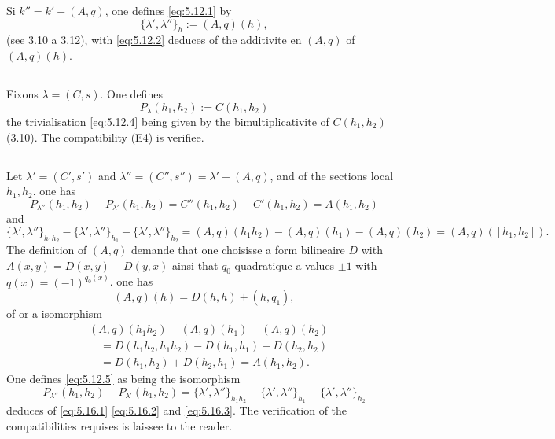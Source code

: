 \documentclass[12pt,a4paper]{article}
\theoremstyle{plain}
\theoremstyle{definition}
\theoremstyle{remark}
\begin{document}
Si $k'' = k' + (A, q)$, one defines \eqref{eq:5.12.1} by
\[
\{\lambda', \lambda''\}_h := (A, q)(h),
\]
(see 3.10 a 3.12), with \eqref{eq:5.12.2} deduces of the additivite en $(A, q)$ of $(A, q)(h)$.

\subsection{}

Fixons $\lambda = (C, s)$. One defines
\[
P_\lambda(h_1, h_2) := C(h_1, h_2)
\]
the trivialisation \eqref{eq:5.12.4} being given by the bimultiplicativite of $C(h_1, h_2)$ (3.10).
The compatibility (E4) is verifiee.

\subsection{}

Let $\lambda' = (C', s')$ and $\lambda'' = (C'', s'') = \lambda' + (A, q)$, and of the sections local
$h_1, h_2$. one has
\begin{equation}\label{eq:5.16.1}
P_{\lambda''}(h_1, h_2) - P_{\lambda'}(h_1, h_2) = C''(h_1, h_2) - C'(h_1, h_2) = A(h_1, h_2)
\end{equation}
and
\begin{equation}\label{eq:5.16.2}
\{\lambda', \lambda''\}_{h_1 h_2} - \{\lambda', \lambda''\}_{h_1} - \{\lambda', \lambda''\}_{h_2} = (A, q)(h_1 h_2) - (A, q)(h_1) - (A, q)(h_2) = (A, q)([h_1, h_2]).
\end{equation}
The definition of $(A, q)$ demande that one choisisse a form bilineaire $D$ with
$A(x, y) = D(x, y) - D(y, x)$ ainsi that $q_0$ quadratique a values $\pm 1$ with
$q(x) = (-1)^{q_0(x)}$.
one has
\[
(A, q)(h) = D(h, h) + (h, q_1),
\]
of or a isomorphism
\begin{equation}\label{eq:5.16.3}
\begin{aligned}
&(A, q)(h_1 h_2) - (A, q)(h_1) - (A, q)(h_2) \\
&\quad = D(h_1 h_2, h_1 h_2) - D(h_1, h_1) - D(h_2, h_2) \\
&\quad = D(h_1, h_2) + D(h_2, h_1) = A(h_1, h_2).
\end{aligned}
\end{equation}
One defines \eqref{eq:5.12.5} as being the isomorphism
\[
P_{\lambda''}(h_1, h_2) - P_{\lambda'}(h_1, h_2) = \{\lambda', \lambda''\}_{h_1 h_2} - \{\lambda', \lambda''\}_{h_1} - \{\lambda', \lambda''\}_{h_2}
\]
deduces of \eqref{eq:5.16.1} \eqref{eq:5.16.2} and \eqref{eq:5.16.3}. The verification of the compatibilities requises is
laissee to the reader.
\end{document}
